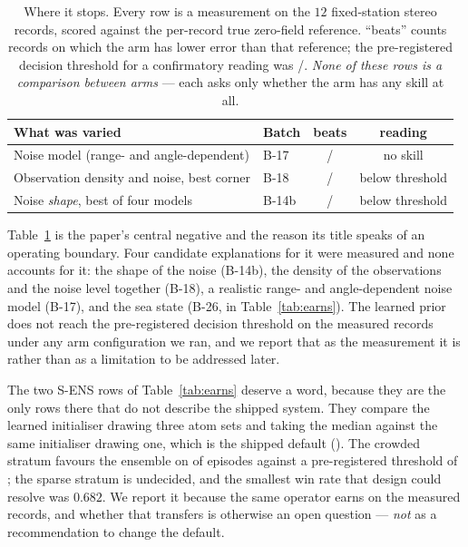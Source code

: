 \documentclass[review]{elsarticle}
\begin{document}
\begin{table}[!htbp]
\centering
\caption{Where it stops. Every row is a measurement on the $12$ fixed-station
stereo records, scored against the per-record true zero-field reference. ``beats''
counts records on which the arm has lower error than that reference; the
pre-registered decision threshold for a confirmatory reading was
\BEighteenConfirm{}/\BEighteenN{}. \emph{None of these rows is a comparison
between arms} --- each asks only whether the arm has any skill at all.}
\label{tab:boundary}
\small
\begin{tabular}{llcc}
\toprule
What was varied & Batch & beats & reading \\
\midrule
Noise model (range- and angle-dependent) & B-17 & \BSeventeenBeats{}/\BSeventeenN{} & no skill \\
Observation density and noise, best corner & B-18 & \BEighteenBeats{}/\BEighteenN{} & below threshold \\
Noise \emph{shape}, best of four models & B-14b & \BFourteenBBeats{}/\BFourteenBN{} & below threshold \\
\bottomrule
\end{tabular}
\end{table}

Table~\ref{tab:boundary} is the paper's central negative and the reason its title
speaks of an operating boundary. Four candidate explanations for it were measured
and none accounts for it: the shape of the noise (B-14b), the density of the
observations and the noise level together (B-18), a realistic range- and
angle-dependent noise model (B-17), and the sea state (B-26, in
Table~\ref{tab:earns}). The learned prior does not reach the pre-registered
decision threshold on the measured records under any arm configuration we ran, and
we report that as the measurement it is rather than as a limitation to be
addressed later.

The two S-ENS rows of Table~\ref{tab:earns} deserve a word, because they are the
only rows there that do not describe the shipped system. They compare the learned
initialiser drawing three atom sets and taking the median against the same
initialiser drawing one, which is the shipped default (\DepLearnedEnsK{}). The
crowded stratum favours the ensemble on \SEnsBetter{} of \SEnsN{} episodes against
a pre-registered threshold of \SEnsNominal{}; the sparse stratum is undecided, and
the smallest win rate that design could resolve was $0.682$. We report it because the
same operator earns on the measured records, and whether that transfers is otherwise
an open question --- \emph{not} as a recommendation to change the default.
\end{document}
